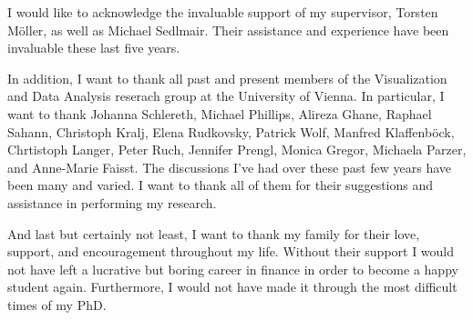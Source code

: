 
I would like to acknowledge the invaluable support of my supervisor, Torsten
M{\"o}ller, as well as Michael Sedlmair. Their assistance and experience have
been invaluable these last five years.

In addition, I want to thank all past and present members of the Visualization
and Data Analysis reserach group at the University of Vienna. In particular, I
want to thank Johanna Schlereth, Michael Phillips, Alireza Ghane, Raphael
Sahann, Christoph Kralj, Elena Rudkovsky, Patrick Wolf, Manfred
Klaffenb{\"o}ck, Chrtistoph Langer, Peter Ruch, Jennifer Prengl, Monica Gregor,
Michaela Parzer, and Anne-Marie Faisst. The
discussions I've had over these past few years have been many and varied. I
want to thank all of them for their suggestions and assistance in performing my
research.

And last but certainly not least, I want to thank my family for their love,
support, and encouragement throughout my life. Without their support I would
not have left a lucrative but boring career in finance in order to become a
happy student again. Furthermore, I would not have made it through the
most difficult times of my PhD.


